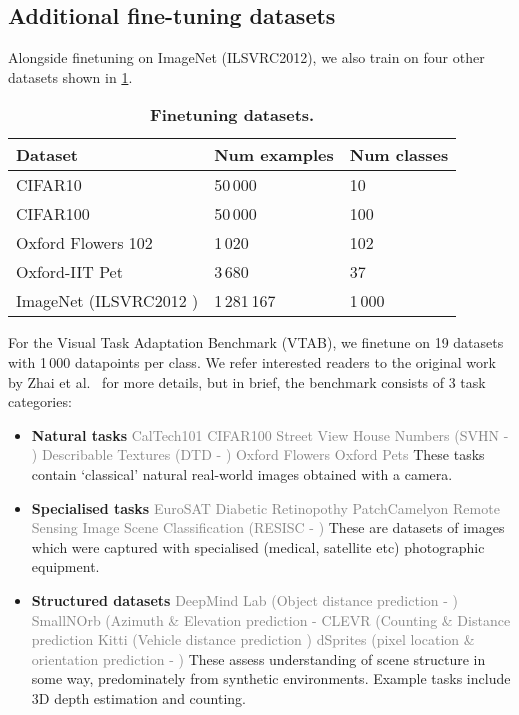 \documentclass{article}
\begin{document}
\subsection{Additional fine-tuning datasets}\label{sec:additional_datasets}
Alongside finetuning on ImageNet (ILSVRC2012\cite{deng2009imagenet}), we also train on four other datasets shown in \cref{tab:finetuning_datasets}.
\begin{table}[]
\caption{\textbf{Finetuning datasets.}
\label{tab:finetuning_datasets}}
\begin{tabular}{@{}lll@{}}
\toprule
Dataset                                        & Num examples & Num classes \\ \midrule
CIFAR10 \cite{krizhevsky2009learning}           & 50\,000       & 10          \\
CIFAR100 \cite{krizhevsky2009learning}          & 50\,000       & 100         \\
Oxford Flowers 102 \cite{nilsback2008automated} & 1\,020        & 102         \\
Oxford-IIT Pet \cite{parkhi2012cats}            & 3\,680        & 37          \\
ImageNet (ILSVRC2012 \cite{deng2009imagenet})   & 1\,281\,167   & 1\,000      \\
\bottomrule
\end{tabular}
\end{table}
For the Visual Task Adaptation Benchmark (VTAB\cite{zhai2019large}), we finetune on 19 datasets with 1\,000 datapoints per class. We refer interested readers to the original work by Zhai et al.~\cite{zhai2019large} for more details, but in brief, the benchmark consists of 3 task categories:

\begin{itemize}
    \item \textbf{Natural tasks}
    \small{\textcolor{gray}{CalTech101 \cite{caltech101}  CIFAR100 \cite{krizhevsky2009learning}  Street View House Numbers (SVHN - \cite{svhn})  Describable Textures (DTD - \cite{dtd})  Oxford Flowers \cite{nilsback2008automated}  Oxford Pets \cite{parkhi2012cats}}}
    \normalsize These tasks contain `classical' natural real-world images obtained with a camera.
    \item \textbf{Specialised tasks}
    \small{\textcolor{gray}{EuroSAT \cite{eurosat}  Diabetic Retinopothy \cite{retino} PatchCamelyon \cite{camelyon}  Remote Sensing Image Scene Classification (RESISC - \cite{resisc})
    }}
    \normalsize These are datasets of images which were captured with specialised (medical, satellite etc) photographic equipment.
    \item \textbf{Structured datasets}
    \small{\textcolor{gray}{
    DeepMind Lab (Object distance prediction - \cite{zhai2019largescale})  SmallNOrb (Azimuth \& Elevation prediction - \cite{smallnorb} CLEVR (Counting \& Distance prediction \cite{clevr}  Kitti (Vehicle distance prediction \cite{kitti})  dSprites (pixel location \& orientation prediction - \cite{dsprites})
    }}
    \normalsize These assess understanding of scene structure in some way, predominately from synthetic environments. Example tasks include 3D depth estimation and counting.
\end{itemize}
\end{document}
